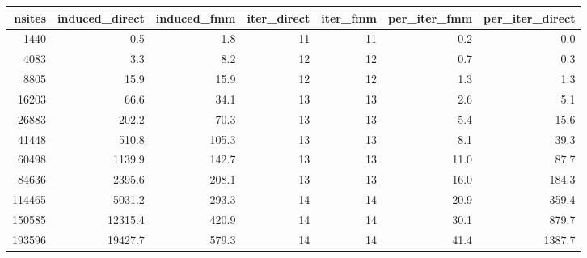 \begin{tabular}{rrrrrrr}
\toprule
 nsites &  induced\_direct &  induced\_fmm &  iter\_direct &  iter\_fmm &  per\_iter\_fmm &  per\_iter\_direct \\
\midrule
   1440 &             0.5 &          1.8 &           11 &        11 &           0.2 &              0.0 \\
   4083 &             3.3 &          8.2 &           12 &        12 &           0.7 &              0.3 \\
   8805 &            15.9 &         15.9 &           12 &        12 &           1.3 &              1.3 \\
  16203 &            66.6 &         34.1 &           13 &        13 &           2.6 &              5.1 \\
  26883 &           202.2 &         70.3 &           13 &        13 &           5.4 &             15.6 \\
  41448 &           510.8 &        105.3 &           13 &        13 &           8.1 &             39.3 \\
  60498 &          1139.9 &        142.7 &           13 &        13 &          11.0 &             87.7 \\
  84636 &          2395.6 &        208.1 &           13 &        13 &          16.0 &            184.3 \\
 114465 &          5031.2 &        293.3 &           14 &        14 &          20.9 &            359.4 \\
 150585 &         12315.4 &        420.9 &           14 &        14 &          30.1 &            879.7 \\
 193596 &         19427.7 &        579.3 &           14 &        14 &          41.4 &           1387.7 \\
\bottomrule
\end{tabular}
